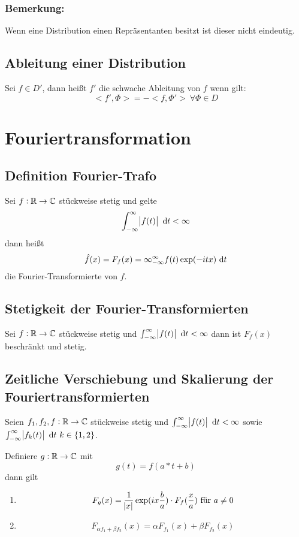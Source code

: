 \subsubsection{Bemerkung:}
Wenn eine Distribution einen Repräsentanten besitzt ist dieser nicht eindeutig.

\subsection{Ableitung einer Distribution}
Sei $f\in D'$, dann heißt $f'$ die schwache Ableitung von
$f$ wenn gilt:
\begin{equation*}
    <f', \Phi> = -<f, \Phi'>\ \forall \Phi \in D
\end{equation*}

\section{Fouriertransformation}
\subsection{Definition Fourier-Trafo}
Sei $f: \mathbb{R} \to \mathbb{C}$ stückweise stetig und gelte
\begin{equation*}
    \int_{-\infty}^\infty \abs{f(t)} \text{ d}t < \infty
\end{equation*}
dann heißt
\begin{equation*}
    \hat{f}(x) = F_f(x) = \infty_{-\infty}^\infty
    f(t) \exp(-itx) \text{ d}t
\end{equation*}
die Fourier-Transformierte von $f$.

\subsection{Stetigkeit der Fourier-Transformierten}
Sei $f: \mathbb{R} \to \mathbb{C}$ stückweise stetig und $\int_{-\infty}^\infty \abs{f(t)} \text{ d}t < \infty$
dann ist $F_f(x)$ beschränkt und stetig.

\subsection{Zeitliche Verschiebung und Skalierung der Fouriertransformierten}
Seien $f_1, f_2, f: \mathbb{R} \to \mathbb{C}$ stückweise stetig und $\int_{-\infty}^\infty \abs{f(t)} \text{ d}t < \infty$ sowie
$\int_{-\infty}^\infty \abs{f_k(t)} \text{ d}t\ k \in \{1,2\}$.

Definiere $g: \mathbb{R} \to \mathbb{C}$ mit
\begin{equation*}
    g(t) = f(a*t + b)
\end{equation*}
dann gilt
\begin{enumerate}
    \item 
        \begin{equation*}
            F_g(x) = \frac{1}{\abs{x}} \exp(i x \frac{b}{a}) \cdot F_f(\frac{x}{a})\ \text{für } a \neq 0
        \end{equation*}
    \item
        \begin{equation*}
            F_{\alpha f_1 + \beta f_2} (x) = \alpha F_{f_1}(x) + \beta F_{f_2}(x)
        \end{equation*}
\end{enumerate}

